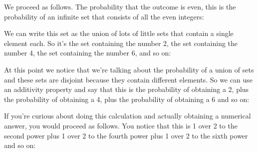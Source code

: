 \documentclass[pdftex, brazil, 12pt, twoside]{article}
\begin{document}
We proceed as follows.
The probability that the outcome is even, this is the
probability of an infinite set that consists of
all the even integers:

\begin{figure}[H]
  \begin{center}
  \end{center}
\end{figure}

We can write this set as the union of lots of little sets
that contain a single element each.
So it's the set containing the number 2, the set containing
the number 4, the set containing the
number 6, and so on:

\begin{figure}[H]
  \begin{center}
  \end{center}
\end{figure}

At this point we notice that we're talking about the
probability of a union of sets and these sets are disjoint
because they contain different elements.
So we can use an additivity property and say that this is
the probability of obtaining a 2, plus the probability of
obtaining a 4, plus the probability of
obtaining a 6 and so on:

\begin{figure}[H]
  \begin{center}
  \end{center}
\end{figure}

If you're curious about doing this calculation and actually
obtaining a numerical answer, you would proceed as follows.
You notice that this is 1 over 2 to the second power plus 1
over 2 to the fourth power plus 1 over 2 to the sixth
power and so on:
\end{document}
